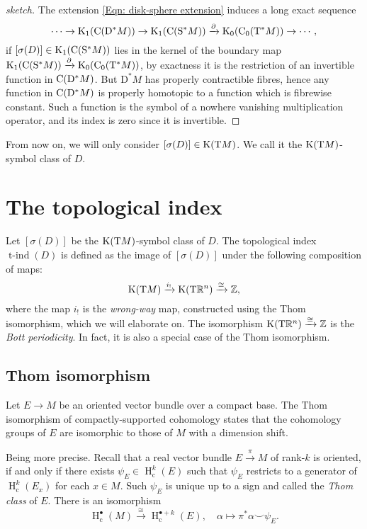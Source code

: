 \documentclass[reqno]{scrartcl}
\theoremstyle{definition}
\theoremstyle{remark}
\newcommand{\tind}{\operatorname{t-ind}}
\newcommand{\Hc}{\operatorname{H}_{\mathrm{c}}} %
\renewcommand{\cup}{\smile}
\begin{document}
\begin{proof}[sketch]
The extension \eqref{Eqn: disk-sphere extension} induces a long exact sequence
\[ \cdots\to\operatorname{K}_1(\mathrm{C}(\mathrm{D}^*M))\to\operatorname{K}_1(\mathrm{C}(\mathrm{S}^*M))\xrightarrow{\partial}\operatorname{K}_0(\mathrm{C}_0(\mathrm{T}^*M))\to\cdots, \]
if $[\sigma(D)]\in\operatorname{K}_1(\mathrm{C}(\mathrm{S}^*M))$ lies in the kernel of the boundary map $\operatorname{K}_1(\mathrm{C}(\mathrm{S}^*M))\xrightarrow{\partial}\operatorname{K}_0(\mathrm{C}_0(\mathrm{T}^*M))$, by exactness it is the restriction of an invertible function in $\mathrm{C}(\mathrm{D}^*M)$. But $\mathrm{D}^*M$ has properly contractible fibres, hence any function in $\mathrm{C}(\mathrm{D}^*M)$ is properly homotopic to a function which is fibrewise constant. Such a function is the symbol of a nowhere vanishing multiplication operator, and its index is zero since it is invertible.
\end{proof}

From now on, we will only consider $[\sigma(D)]\in\operatorname{K}(\mathrm{T}M)$. We call it the $\operatorname{K}(\mathrm{T}M)$-symbol class of $D$.



\section{The topological index} \label{Sec: topological index}
Let $[\sigma(D)]$ be the $\operatorname{K}(\mathrm{T}M)$-symbol class of $D$. The topological index $\tind(D)$ is defined as the image of $[\sigma(D)]$ under the following composition of maps: 
\[ \operatorname{K}(\mathrm{T}M)\xrightarrow{i_!}\operatorname{K}(\mathrm{T}\mathbb{R}^n)\xrightarrow{\cong}\mathbb{Z}, \]
where the map $i_!$ is the \emph{wrong-way} map, constructed using the Thom isomorphism, which we will elaborate on. The isomorphism $\operatorname{K}(\mathrm{T}\mathbb{R}^n)\xrightarrow{\cong}\mathbb{Z}$ is the \emph{Bott periodicity}. In fact, it is also a special case of the Thom isomorphism.

\subsection{Thom isomorphism} \label{Sec: Thom isomorphism}
Let $E\to M$ be an oriented vector bundle over a compact base. The Thom isomorphism of compactly-supported cohomology states that the cohomology groups of $E$ are isomorphic to those of $M$ with a dimension shift.

Being more precise. Recall that a real vector bundle $E\xrightarrow{\pi}M$ of rank-$k$ is oriented, if and only if there exists $\psi_E\in\Hc^k(E)$ such that $\psi_E$ restricts to a generator of $\Hc^k(E_x)$ for each $x\in M$. Such $\psi_E$ is unique up to a sign and called the \emph{Thom class} of $E$. There is an isomorphism
\[ \Hc^\bullet(M)\xrightarrow{\cong}\Hc^{\bullet+k}(E),\quad \alpha\mapsto\pi^*\alpha\cup\psi_E. \]
\end{document}
